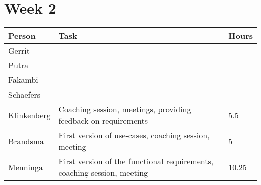 \section{Week 2}
\begin{tabular}{L{0.2\textwidth} L{0.7\textwidth} L{0.1\textwidth}}
    \textbf{Person} & \textbf{Task} & \textbf{Hours} \\ \toprule
	Gerrit &  &  \\ \midrule
	Putra &  &  \\ \midrule
	Fakambi & & \\ \midrule
	Schaefers &  & \\ \midrule
	Klinkenberg & Coaching session, meetings, providing feedback on requirements & 5.5\\ \midrule
	Brandsma & First version of use-cases, coaching session, meeting & 5 \\ \midrule
	Menninga & First version of the functional requirements, coaching session, meeting & 10.25 \\ \bottomrule
\end{tabular}